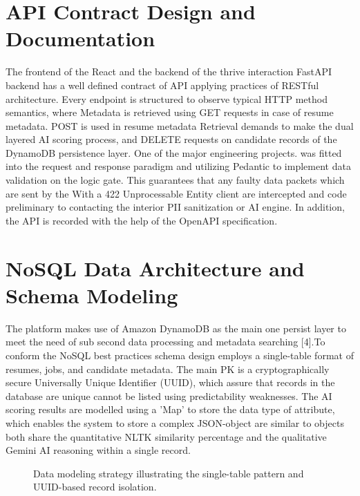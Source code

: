 \documentclass[conference]{IEEEtran}
\begin{document}
\section{API Contract Design and Documentation}
The frontend of the React and the backend of the thrive interaction FastAPI backend has a well defined contract of API applying practices of RESTful architecture. Every endpoint is structured to observe typical HTTP method semantics, where Metadata is retrieved using GET requests in case of resume metadata. POST is used in resume metadata Retrieval demands to make the dual layered AI scoring process, and DELETE requests on candidate records of the DynamoDB persistence layer. One of the major engineering projects. was fitted into the request and response paradigm and utilizing Pedantic to implement data validation on the logic gate. This guarantees that any faulty data packets which are sent by the With a 422 Unprocessable Entity client are intercepted and code preliminary to contacting the interior PII sanitization or AI engine. In addition, the API is recorded with the help of the OpenAPI specification. 

\section{NoSQL Data Architecture and Schema Modeling}
The platform makes use of Amazon DynamoDB as the main one persist layer to meet the need of sub second data processing and metadata searching [4].To conform the NoSQL best practices schema design employs a single-table format of resumes, jobs, and candidate metadata. The main PK is a cryptographically secure Universally Unique Identifier (UUID), which assure that records in the database are unique cannot be listed using predictability weaknesses. The AI scoring results are modelled using a ’Map’ to store the data type of attribute, which enables the system to store a complex JSON-object are similar to objects both share the quantitative NLTK similarity percentage and the qualitative Gemini AI reasoning within a single record. 

\begin{figure}[b]
\centering
{}
\caption{Data modeling strategy illustrating the single-table pattern and UUID-based record isolation.}
\label{fig:ddb_model}
\end{figure}
\end{document}
